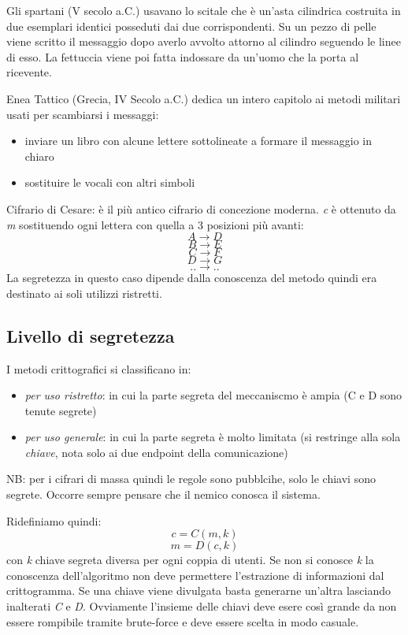 Gli spartani (V secolo a.C.) usavano lo scitale che è un'asta cilindrica costruita in due esemplari identici posseduti dai due corrispondenti. Su un pezzo di pelle viene scritto il messaggio dopo averlo avvolto attorno al cilindro seguendo le linee di esso. La fettuccia viene poi fatta indossare da un'uomo che la porta al ricevente.

Enea Tattico (Grecia, IV Secolo a.C.) dedica un intero capitolo ai metodi militari usati per scambiarsi i messaggi:
\begin{itemize}
    \item inviare un libro con alcune lettere sottolineate a formare il messaggio in chiaro
    \item sostituire le vocali con altri simboli
\end{itemize}

Cifrario di Cesare: è il più antico cifrario di concezione moderna. \emph{c} è ottenuto da \emph{m} sostituendo ogni lettera con quella a 3 posizioni più avanti:
$$ A \longrightarrow D $$
$$ B \longrightarrow E $$
$$ C \longrightarrow F $$
$$ D \longrightarrow G $$
$$ .. \longrightarrow .. $$
La segretezza in questo caso dipende dalla conoscenza del metodo quindi era destinato ai soli utilizzi ristretti.

\subsection{Livello di segretezza}
I metodi crittografici si classificano in:
\begin{itemize}
    \item \emph{per uso ristretto}: in cui la parte segreta del meccaniscmo è ampia (C e D sono tenute segrete)
    \item \emph{per uso generale}: in cui la parte segreta è molto limitata (si restringe alla sola \emph{chiave}, nota solo ai due endpoint della comunicazione)
\end{itemize}
NB: per i cifrari di massa quindi le regole sono pubblcihe, solo le chiavi sono segrete. Occorre sempre pensare che il nemico conosca il sistema.

Ridefiniamo quindi:
$$ c = C(m, k) $$
$$ m = D(c, k) $$
con \emph{k} chiave segreta diversa per ogni coppia di utenti.
Se non si conosce \emph{k} la conoscenza dell'algoritmo non deve permettere l'estrazione di informazioni dal crittogramma. Se una chiave viene divulgata basta generarne un'altra lasciando inalterati \emph{C} e \emph{D}.
Ovviamente l'insieme delle chiavi deve esere così grande da non essere rompibile tramite brute-force e deve essere scelta in modo casuale.

